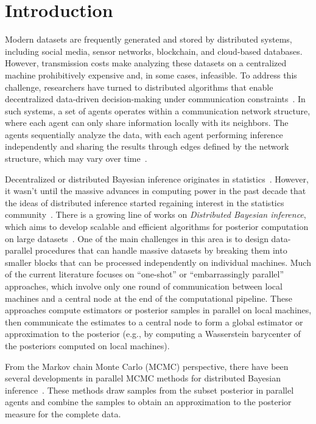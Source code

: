 \documentclass[twoside,11pt]{article}
\numberwithin{equation}{section}
\begin{document}
\section{Introduction}
Modern datasets are frequently generated and stored by distributed systems, including social media, sensor networks, blockchain, and cloud-based databases. However, transmission costs make analyzing these datasets on a centralized machine prohibitively expensive and, in some cases, infeasible. To address this challenge, researchers have turned to distributed algorithms that enable decentralized data-driven decision-making under communication constraints~{\citep{borkar1982asymptotic, tsitsiklis1984convergence, gubner1993distributed}}. In such systems, a set of agents operates within a communication network structure, where each agent can only share information locally with its neighbors. The agents sequentially analyze the data, with each agent performing inference independently and sharing the results through edges defined by the network structure, which may vary over time~\citep{Nedic2017, Uribe2022-2}. 

Decentralized or distributed Bayesian inference originates in statistics~\citep{degroot1974reaching, gilardoni1993reaching}. However, it wasn't until the massive advances in computing power in the past decade that the ideas of distributed inference started regaining interest in the statistics community~\citep{Uribe2022-1,Uribe2022-2}. There is a growing line of works on \textit{Distributed Bayesian inference}, which aims to develop scalable and efficient algorithms for posterior computation on large datasets~\citep{jordan2018communication}. One of the main challenges in this area is to design data-parallel procedures that can handle massive datasets by breaking them into smaller blocks that can be processed independently on individual machines. Much of the current literature focuses on ``one-shot'' or ``embarrassingly parallel'' approaches, which involve only one round of communication between local machines and a central node at the end of the computational pipeline. These approaches compute estimators or posterior samples in parallel on local machines, then communicate the estimates to a central node to form a global estimator or approximation to the posterior (e.g., by computing a Wasserstein barycenter of the posteriors computed on local machines).

From the Markov chain Monte Carlo (MCMC) perspective, there have been several developments in parallel MCMC methods for distributed Bayesian inference~\citep{Neiswanger2013, Wang2013, Minsker2014, Wang2015, Rabinovich2015, Scott2016, Li2017, Minsker2017}. These methods draw samples from the subset posterior in parallel agents and combine the samples to obtain an approximation to the posterior measure for the complete data. 
\end{document}
